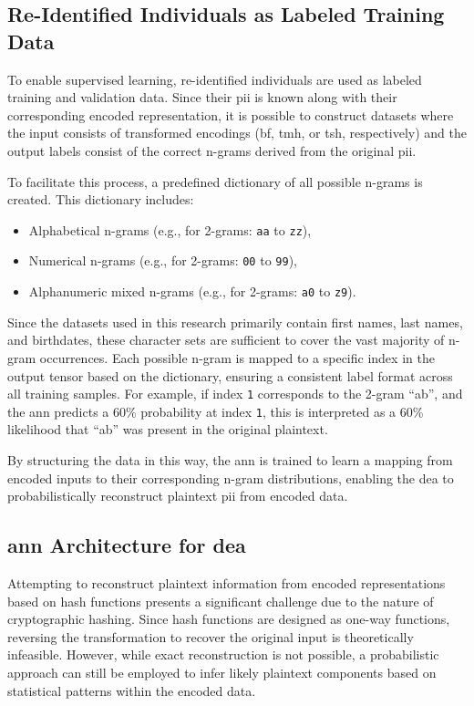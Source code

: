 \subsection{Re-Identified Individuals as Labeled Training Data}

To enable supervised learning, re-identified individuals are used as labeled training and validation data.
Since their \ac{pii} is known along with their corresponding encoded representation, it is possible to construct datasets where the input consists of transformed encodings (\ac{bf}, \ac{tmh}, or \ac{tsh}, respectively) and the output labels consist of the correct n-grams derived from the original \ac{pii}.

To facilitate this process, a predefined dictionary of all possible n-grams is created. This dictionary includes:
\begin{itemize}
   \item Alphabetical n-grams (e.g., for 2-grams: \texttt{aa} to \texttt{zz}),
   \item Numerical n-grams (e.g., for 2-grams: \texttt{00} to \texttt{99}),
   \item Alphanumeric mixed n-grams (e.g., for 2-grams: \texttt{a0} to \texttt{z9}).
\end{itemize}

Since the datasets used in this research primarily contain first names, last names, and birthdates, these character sets are sufficient to cover the vast majority of n-gram occurrences.
Each possible n-gram is mapped to a specific index in the output tensor based on the dictionary, ensuring a consistent label format across all training samples.
For example, if index \texttt{1} corresponds to the 2-gram \enquote{ab}, and the \ac{ann} predicts a 60\% probability at index \texttt{1}, this is interpreted as a 60\% likelihood that \enquote{ab} was present in the original plaintext.

By structuring the data in this way, the \ac{ann} is trained to learn a mapping from encoded inputs to their corresponding n-gram distributions, enabling the \ac{dea} to probabilistically reconstruct plaintext \ac{pii} from encoded data.


\subsection{\ac{ann} Architecture for \ac{dea}} \label{sec:architecture}

Attempting to reconstruct plaintext information from encoded representations based on hash functions presents a significant challenge due to the nature of cryptographic hashing.
Since hash functions are designed as one-way functions, reversing the transformation to recover the original input is theoretically infeasible.
However, while exact reconstruction is not possible, a probabilistic approach can still be employed to infer likely plaintext components based on statistical patterns within the encoded data.

